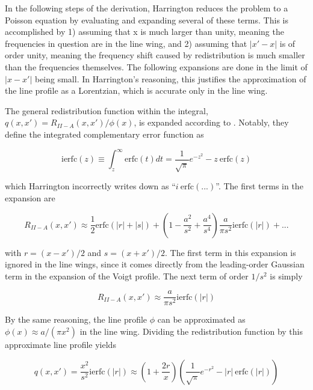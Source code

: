 \documentclass[onecolumn]{aastex63}
\begin{document}
In the following steps of the derivation, Harrington reduces the problem to a Poisson equation by evaluating and expanding several of these terms. This is accomplished by 1) assuming that x is much larger than unity, meaning the frequencies in question are in the line wing, and 2) assuming that $|x'-x|$ is of order unity, meaning the frequency shift caused by redistribution is much smaller than the frequencies themselves. The following expansions are done in the limit of $|x-x'|$ being small. In Harrington's reasoning, this justifies the approximation of the line profile as a Lorentzian, which is accurate only in the line wing.

The general redistribution function within the integral, $q(x, x') = R_{II-A}(x, x')/\phi (x)$, is expanded according to \cite{1971JQSRT..11.1365A}. Notably, they define the integrated complementary error function as 

\begin{equation}
    \mathrm{ierfc}(z) \equiv \int_z^{\infty} \mathrm{erfc}(t) dt = \frac{1}{\sqrt{\pi}} e^{-z^2} - z\  \mathrm{erfc}(z)
\end{equation}

which Harrington incorrectly writes down as ``$i\ \mathrm{erfc(...)}$''. The first terms in the expansion are 

\begin{equation}
    R_{II-A}(x, x') \approx \frac{1}{2}\mathrm{erfc}(|r|+|s|) + \left(1 - \frac{a^2}{s^2} + \frac{a^4}{s^4}\right) \frac{a}{\pi s^2} \mathrm{ierfc}(|r|) + ...
\end{equation}

with $r=(x-x')/2$ and $s=(x+x')/2$. The first term in this expansion is ignored in the line wings, since it comes directly from the leading-order Gaussian term in the expansion of the Voigt profile. The next term of order $1/s^2$ is simply

\begin{equation}
    R_{II-A}(x, x') \approx \frac{a}{\pi s^2}\mathrm{ierfc}(|r|)
\end{equation}

By the same reasoning, the line profile $\phi$ can be approximated as $\phi(x) \approx a/(\pi x^2)$ in the line wing. Dividing the redistribution function by this approximate line profile yields 

\begin{equation}
    q(x, x') = \frac{x^2}{s^2} \mathrm{ierfc}(|r|) \approx \left(1+\frac{2r}{x}\right)\left(\frac{1}{\sqrt{\pi}}e^{-r^2} - |r|\ \mathrm{erfc}(|r|)\right)
\end{equation}
\end{document}
